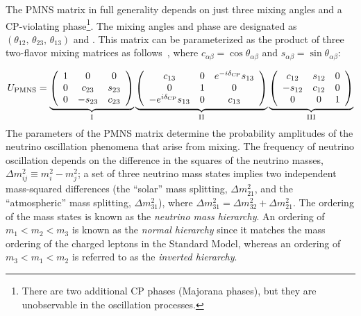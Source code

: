 The PMNS matrix in full generality depends on just three mixing angles
and a CP-violating phase\footnote{There are two additional CP phases (Majorana phases), but they are unobservable in the oscillation processes.}.  The mixing angles and phase are designated
as $(\theta_{12},\, \theta_{23},\, \theta_{13})$ and
\deltacp.
This matrix can be parameterized as the product of three
two-flavor mixing matrices as follows~\cite{Schechter:1980gr}, where $c_{\alpha \beta}=\cos \theta_{\alpha \beta}$ and $s_{\alpha
  \beta}=\sin \theta_{\alpha \beta}$:

\begin{equation}
U_{\rm PMNS} = 
  \underbrace{
    \left( \begin{array}{ccc}
        1 & 0 & 0 \\ 
        0 & c_{23} & s_{23} \\ 
        0 & -s_{23} & c_{23}
    \end{array} \right)
  }_{\rm I}
\underbrace{
  \left( \begin{array}{ccc}
      c_{13} & 0 & e^{-i\mdeltacp}s_{13} \\ 
      0 & 1 & 0 \\ 
      -e^{i\mdeltacp}s_{13} & 0 & c_{13}
  \end{array} \right) 
}_{\rm II}
\underbrace{
 \left( \begin{array}{ccc}
      c_{12} & s_{12} & 0 \\ 
      -s_{12} & c_{12} & 0 \\ 
      0 & 0 & 1
  \end{array} \right) 
}_{\rm III}
\label{eqn:pmns}
\end{equation}
The parameters of the PMNS
matrix determine the probability amplitudes of the neutrino
oscillation phenomena that arise from mixing.  The frequency of neutrino oscillation 
depends on the difference in the squares of the neutrino
masses, $\Delta m^{2}_{ij} \equiv m^{2}_{i} - m^{2}_{j}$; a set of three
neutrino mass states implies two independent mass-squared differences
(the ``solar'' mass splitting, $\Delta m^{2}_{21}$, and the ``atmospheric'' mass splitting, 
$\Delta m^{2}_{31}$), where $\Delta m^{2}_{31} = \Delta m^{2}_{32} + \Delta m^{2}_{21}$. The ordering of the
mass states is known as the \emph{neutrino mass hierarchy}. An ordering of
$m_1 < m_2 < m_3$ is known as the \emph{normal hierarchy} since it matches
the mass ordering of the charged leptons in the Standard Model, whereas an ordering of $m_3 < m_1 < m_2$
is referred to as the \emph{inverted hierarchy}.


